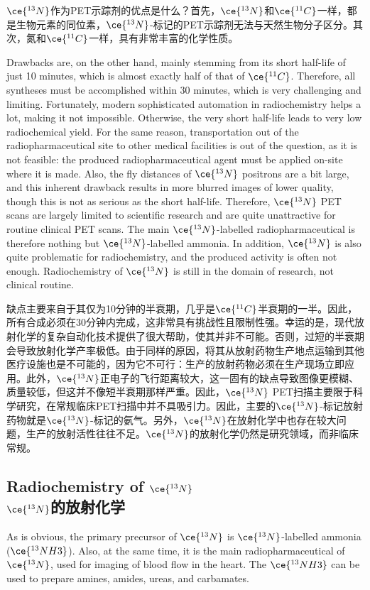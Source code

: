 \documentclass[dvipsnames, svgnames,a4paper,11pt]{article}
\begin{document}
\(\ce{^{13}N}\)作为PET示踪剂的优点是什么？首先，\(\ce{^{13}N}\)和\(\ce{^{11}C}\)一样，都是生物元素的同位素，\(\ce{^{13}N}\)-标记的PET示踪剂无法与天然生物分子区分。其次，氮和\(\ce{^{11}C}\)一样，具有非常丰富的化学性质。

Drawbacks are, on the other hand, mainly stemming from its short half-life of just 10 minutes, which is almost exactly half of that of \(\ce{^{11}C}\). Therefore, all syntheses must be accomplished within 30 minutes, which is very challenging and limiting. Fortunately, modern sophisticated automation in radiochemistry helps a lot, making it not impossible. Otherwise, the very short half-life leads to very low radiochemical yield. For the same reason, transportation out of the radiopharmaceutical site to other medical facilities is out of the question, as it is not feasible: the produced radiopharmaceutical agent must be applied on-site where it is made. Also, the fly distances of \(\ce{^{13}N}\) positrons are a bit large, and this inherent drawback results in more blurred images of lower quality, though this is not as serious as the short half-life. Therefore, \(\ce{^{13}N}\) PET scans are largely limited to scientific research and are quite unattractive for routine clinical PET scans. The main \(\ce{^{13}N}\)-labelled radiopharmaceutical is therefore nothing but \(\ce{^{13}N}\)-labelled ammonia. In addition, \(\ce{^{13}N}\) is also quite problematic for radiochemistry, and the produced activity is often not enough. Radiochemistry of \(\ce{^{13}N}\) is still in the domain of research, not clinical routine.

缺点主要来自于其仅为10分钟的半衰期，几乎是\(\ce{^{11}C}\)半衰期的一半。因此，所有合成必须在30分钟内完成，这非常具有挑战性且限制性强。幸运的是，现代放射化学的复杂自动化技术提供了很大帮助，使其并非不可能。否则，过短的半衰期会导致放射化学产率极低。由于同样的原因，将其从放射药物生产地点运输到其他医疗设施也是不可能的，因为它不可行：生产的放射药物必须在生产现场立即应用。此外，\(\ce{^{13}N}\)正电子的飞行距离较大，这一固有的缺点导致图像更模糊、质量较低，但这并不像短半衰期那样严重。因此，\(\ce{^{13}N}\) PET扫描主要限于科学研究，在常规临床PET扫描中并不具吸引力。因此，主要的\(\ce{^{13}N}\)-标记放射药物就是\(\ce{^{13}N}\)-标记的氨气。另外，\(\ce{^{13}N}\)在放射化学中也存在较大问题，生产的放射活性往往不足。\(\ce{^{13}N}\)的放射化学仍然是研究领域，而非临床常规。

\subsection{Radiochemistry of \(\ce{^{13}N}\)\\  \(\ce{^{13}N}\)的放射化学}  
As is obvious, the primary precursor of \(\ce{^{13}N}\) is \(\ce{^{13}N}\)-labelled ammonia (\(\ce{^{13}NH3}\)). Also, at the same time, it is the main radiopharmaceutical of \(\ce{^{13}N}\), used for imaging of blood flow in the heart. The \(\ce{^{13}NH3}\) can be used to prepare amines, amides, ureas, and carbamates.  
\end{document}
